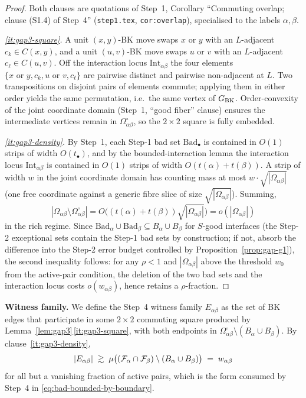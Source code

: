 \begin{proof}
Both clauses are quotations of Step~1, Corollary ``Commuting overlap;
clause (S1.4) of Step~4'' (\texttt{step1.tex},
\texttt{cor:overlap}), specialised to the labels $\alpha,\beta$.

\emph{\ref{it:gap3-square}.}
A unit $(x,y)$-BK move swaps $x$ or $y$ with an $L$-adjacent
$c_k\in C(x,y)$, and a unit $(u,v)$-BK move swaps $u$ or $v$ with an
$L$-adjacent $c_\ell\in C(u,v)$.  Off the interaction locus
$\mathrm{Int}_{\alpha\beta}$ the four elements
$\{x\text{ or }y,c_k,u\text{ or }v,c_\ell\}$ are pairwise distinct and
pairwise non-adjacent at $L$.  Two transpositions on disjoint pairs of
elements commute; applying them in either order yields the same
permutation, i.e.\ the same vertex of $G_{\mathrm{BK}}$.  Order-convexity of
the joint coordinate domain (Step~1, ``good fiber'' clause) ensures
the intermediate vertices remain in $\Omega^{\circ}_{\alpha\beta}$, so
the $2\times 2$ square is fully embedded.

\emph{\ref{it:gap3-density}.}
By Step~1, each Step-1 bad set $\mathrm{Bad}_\bullet$ is contained in
$O(1)$ strips of width $O(t_\bullet)$, and by the bounded-interaction
lemma the interaction locus $\mathrm{Int}_{\alpha\beta}$ is contained
in $O(1)$ strips of width $O(t(\alpha)+t(\beta))$.  A strip of width
$w$ in the joint coordinate domain has counting mass at most
$w\cdot\sqrt{|\Omega_{\alpha\beta}|}$ (one free coordinate against a
generic fibre slice of size $\sqrt{|\Omega_{\alpha\beta}|}$).  Summing,
\[
  |\Omega_{\alpha\beta}\setminus\Omega^{\circ}_{\alpha\beta}|
  = O\bigl((t(\alpha)+t(\beta))\sqrt{|\Omega_{\alpha\beta}|}\bigr)
  = o(|\Omega_{\alpha\beta}|)
\]
in the rich regime.  Since $\mathrm{Bad}_\alpha\cup\mathrm{Bad}_\beta
\subseteq B_\alpha\cup B_\beta$ for $S$-good interfaces (the Step-2
exceptional sets contain the Step-1 bad sets by construction; if not,
absorb the difference into the Step-2 error budget controlled by
Proposition~\ref{prop:gap-g1}), the second inequality follows: for any
$\rho<1$ and
$|\Omega_{\alpha\beta}|$ above the threshold $w_0$ from the active-pair
condition, the deletion of the two bad sets and the interaction locus
costs $o(w_{\alpha\beta})$, hence retains a $\rho$-fraction.
\end{proof}

\textbf{Witness family.}
We define the Step~4 witness family $E_{\alpha\beta}$ as the set of BK
edges that participate in some $2\times 2$ commuting square produced
by Lemma~\ref{lem:gap3}\,\ref{it:gap3-square}, with both endpoints in
$\Omega^{\circ}_{\alpha\beta}\setminus(B_\alpha\cup B_\beta)$.  By
clause~\ref{it:gap3-density},
\[
  |E_{\alpha\beta}|
  \;\gtrsim\;
  \mu\bigl((\mathcal{F}_{\alpha}\cap\mathcal{F}_{\beta})
            \setminus(B_\alpha\cup B_\beta)\bigr)
  \;=\; w_{\alpha\beta}
\]
for all but a vanishing fraction of active pairs, which is the form
consumed by Step~4 in
\eqref{eq:bad-bounded-by-boundary}.

